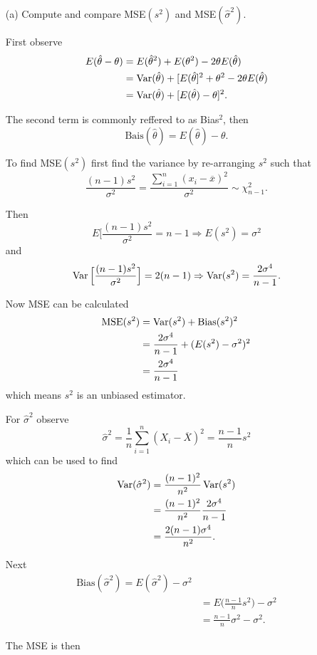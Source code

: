 \documentclass{tufte-book}
\begin{document}
\begin{enumerate}
\item[(a)] Compute and compare MSE$(s^2)$ and MSE$(\hat{\sigma}^2)$.

First observe
\begin{align*}
E(\hat{\theta} - \theta) &= E(\hat{\theta}^2) + E(\theta^2) - 2\theta E(\hat{\theta})\\
&= \operatorname{Var}(\hat{\theta}) + [E(\hat{\theta}]^2 + \theta^2 - 2\theta E(\hat{\theta})\\
&= \operatorname{Var}(\hat{\theta}) + [E(\hat{\theta}) - \theta]^2.
\end{align*}

The second term is commonly reffered to as Bias$^2$, then
\[ \text{Bais}(\hat{\theta})=E(\hat{\theta})-\theta. \]

To find MSE$(s^2)$ first find the variance by re-arranging $s^2$ such that
\[ \frac{(n-1)s^2}{\sigma^2} = \frac{\sum_{i=1}^n(x_i -\overline{x})^2}{\sigma^2} \sim \chi_{n-1}^2. \]

Then
\[ E\Big[\frac{(n-1)s^2}{\sigma^2} = n-1 \Rightarrow E(s^2)=\sigma^2 \]
and
\[ \operatorname{Var}\Big[\frac{(n-1)s^2}{\sigma^2}\Big] = 2(n-1) \Rightarrow \operatorname{Var}(s^2)=\frac{2\sigma^4}{n-1}. \]

Now MSE can be calculated
\begin{align*}
\text{MSE}(s^2) &= \operatorname{Var}(s^2) + \text{Bias}(s^2)^2\\
&=\frac{2\sigma^4}{n-1} + (E(s^2) - \sigma^2)^2\\
&= \frac{2\sigma^4}{n-1}
\end{align*}
which means $s^2$ is an unbiased estimator.

For $\hat{\sigma}^2$ observe
\[ \hat{\sigma}^2 = \frac{1}{n}\sum_{i=1}^n(X_i-\overline{X})^2 = \frac{n-1}{n}s^2 \]
which can be used to find
\begin{align*}
\operatorname{Var}(\hat{\sigma}^2)&= \frac{(n-1)^2}{n^2}\operatorname{Var}(s^2)\\
&=\frac{(n-1)^2}{n^2}\frac{2\sigma^4}{n-1}\\
&= \frac{2(n-1)\sigma^4}{n^2}.
\end{align*}

Next
\begin{align*}
\text{Bias}(\hat{\sigma}^2)=E(\hat{\sigma}^2) - \sigma^2\\
&=E\Big(\frac{n-1}{n}s^2\Big) - \sigma^2\\
&= \frac{n-1}{n}\sigma^2 - \sigma^2.
\end{align*}


The MSE is then


\end{enumerate}
\end{document}
